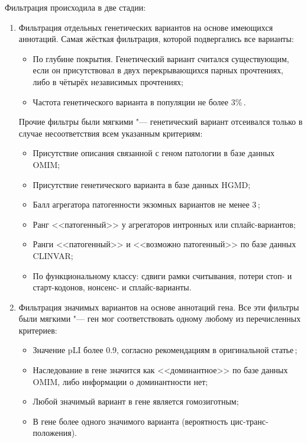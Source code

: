 \documentclass[a4paper,14pt]{extarticle}
\begin{document}
Фильтрация происходила в две стадии:
\begin{enumerate}
\item Фильтрация отдельных генетических вариантов на основе имеющихся аннотаций.
Самая жёсткая фильтрация, которой подвергались все варианты:
\begin{itemize}
\item По глубине покрытия.
Генетический вариант считался существующим, если он присутствовал в двух перекрывающихся парных прочтениях, либо в чётырёх независимых прочтениях;
\item Частота генетического варианта в популяции не более 3\%\,\cite{Ryzhkova_2017}.
\end{itemize}

Прочие фильтры были мягкими "--- генетический вариант отсеивался только в случае несоответствия всем указанным критериям:

\begin{itemize}
\item Присутствие описания связанной с геном патологии в базе данных OMIM;
\item Присутствие генетического варианта в базе данных HGMD;
\item Балл агрегатора патогенности экзомных вариантов не менее 3\,\cite{Ryzhkova_2017};
\item Ранг <<патогенный>> у агрегаторов интронных или сплайс-вариантов;
\item Ранги <<патогенный>> и <<возможно патогенный>> по базе данных CLINVAR;
\item По функциональному классу: сдвиги рамки считывания, потери стоп- и старт-кодонов, нонсенс- и сплайс-варианты.
\end{itemize}

\item Фильтрация значимых вариантов на основе аннотаций гена.
Все эти фильтры были мягкими "--- ген мог соответствовать одному любому из перечисленных критериев:

\begin{itemize}
\item Значение pLI более 0.9, согласно рекомендациям в оригинальной статье\,\cite{Lek_2016};
\item Наследование в гене значится как <<доминантное>> по базе данных OMIM, либо информации о доминантности нет;
\item Любой значимый вариант в гене является гомозиготным;
\item В гене более одного значимого варианта (вероятность цис-транс-положения).
\end{itemize}
\end{enumerate}
\end{document}
